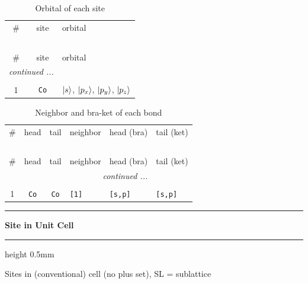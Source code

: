 \documentclass[fleqn,10pt,landscape]{jsarticle}
\begin{document}
\renewcommand{\arraystretch}{1.6}
\begin{longtable}[l]{ccl}
\captionsetup{justification=raggedright, singlelinecheck=off}
\caption{Orbital of each site}
 \\
 \hline \hline
\# & site & orbital \\ \hline \endfirsthead

\multicolumn{2}{l}{\tablename\ \thetable{}} \\
 \hline \hline
\# & site & orbital \\ \hline \endhead

 \hline \hline
\multicolumn{2}{r}{\footnotesize\it continued ...} \\ \endfoot

 \hline \hline
\multicolumn{2}{r}{} \\ \endlastfoot

1 & \texttt{Co} & $\ket{s}$, $\ket{p_{x}}$, $\ket{p_{y}}$, $\ket{p_{z}}$ \\
\end{longtable}
\renewcommand{\arraystretch}{1.6}
\begin{longtable}[l]{ccclll}
\captionsetup{justification=raggedright, singlelinecheck=off}
\caption{Neighbor and bra-ket of each bond}
 \\
 \hline \hline
\# & head & tail & neighbor & head (bra) & tail (ket) \\ \hline \endfirsthead

\multicolumn{5}{l}{\tablename\ \thetable{}} \\
 \hline \hline
\# & head & tail & neighbor & head (bra) & tail (ket) \\ \hline \endhead

 \hline \hline
\multicolumn{5}{r}{\footnotesize\it continued ...} \\ \endfoot

 \hline \hline
\multicolumn{5}{r}{} \\ \endlastfoot

1 & \texttt{Co} & \texttt{Co} & \texttt{[1]} & \texttt{[s,p]} & \texttt{[s,p]} \\
\end{longtable}
\vspace{5mm}
\noindent \rule[0.5mm]{5mm}{0.5mm}\hspace{3mm}\textbf{Site in Unit Cell}\hspace{3mm}\leaders\hrule height 0.5mm\hfill\kern0pt
\vspace{3mm}

\noindent Sites in (conventional) cell (no plus set), SL = sublattice
\end{document}
